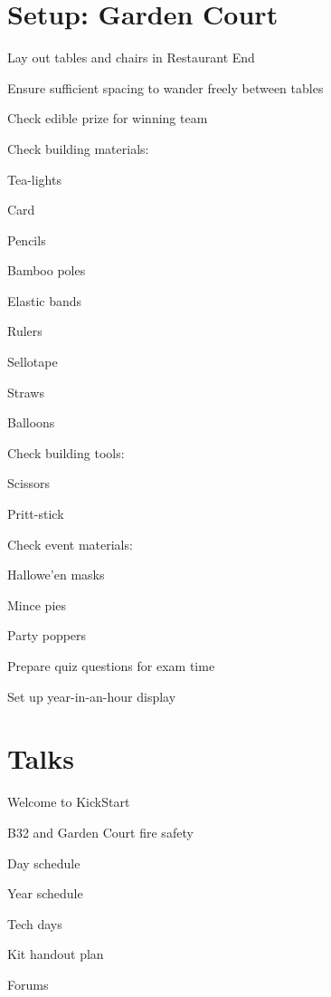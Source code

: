 \documentclass[pdftex,12pt,a4paper]{article}
\newcommand*{\thecheckbox}{\hss$\Box$}
\newenvironment*{checklist}
{\list{}{%
\renewcommand*{\makelabel}[1]{\thecheckbox}}}
{\endlist}
\begin{document}
\section{Setup: Garden Court}
\begin{checklist}
\item Lay out tables and chairs in Restaurant End
\item Ensure sufficient spacing to wander freely between tables
\item Check edible prize for winning team
\item Check building materials:
\begin{checklist}
\item Tea-lights
\item Card
\item Pencils
\item Bamboo poles
\item Elastic bands
\item Rulers
\item Sellotape
\item Straws
\item Balloons
\end{checklist}
\item Check building tools:
\begin{checklist}
\item Scissors
\item Pritt-stick
\end{checklist}
\item Check event materials:
\begin{checklist}
\item Hallowe'en masks
\item Mince pies
\item Party poppers
\end{checklist}
\item Prepare quiz questions for exam time
\item Set up year-in-an-hour display
\end{checklist}
\section{Talks}
\begin{checklist}
\item Welcome to KickStart
\item B32 and Garden Court fire safety
\item Day schedule
\item Year schedule
\item Tech days
\item Kit handout plan
\item Forums
\end{checklist}
\end{document}
